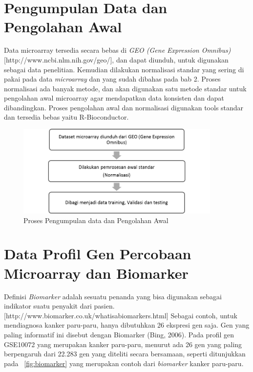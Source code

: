 \section{Pengumpulan Data dan Pengolahan Awal}
Data microarray tersedia secara bebas di \textit{GEO (Gene Expression Omnibus)} [http://www.ncbi.nlm.nih.gov/geo/], dan dapat diunduh, untuk digunakan sebagai data penelitian. Kemudian dilakukan normalisasi standar yang sering di pakai pada data \textit{microarray} dan yang sudah dibahas pada bab 2. Proses normalisasi ada banyak metode, dan akan digunakan satu metode standar untuk pengolahan awal microarray agar mendapatkan data konsisten dan dapat dibandingkan. Proses pengolahan awal dan normalisasi digunakan tools standar dan tersedia bebas yaitu R-Bioconductor. \\

\begin{figure}
	\centering
	\includegraphics[width=0.9\textwidth]
		{pics/bagian1.png}
	\caption{Proses Pengumpulan data dan Pengolahan Awal}
	\label{fig:pengolahan_awal}
\end{figure}


\section{Data Profil Gen Percobaan Microarray dan Biomarker}

Definisi \textit{Biomarker} adalah sesuatu penanda yang bisa digunakan sebagai indikator suatu penyakit dari pasien. [http://www.biomarker.co.uk/whatisabiomarkers.html] Sebagai contoh, untuk mendiagnosa kanker paru-paru, hanya dibutuhkan 26 ekspresi gen saja. Gen yang paling informatif ini disebut dengan Biomarker (Bing, 2006). Pada profil gen GSE10072 yang merupakan kanker paru-paru, menurut  \cite{belinsky2004gene} ada 26 gen yang paling berpengaruh dari 22.283 gen yang diteliti secara bersamaan, seperti ditunjukkan pada \pic~\ref{fig:biomarker} yang merupakan contoh dari \textit{biomarker} kanker paru-paru.

